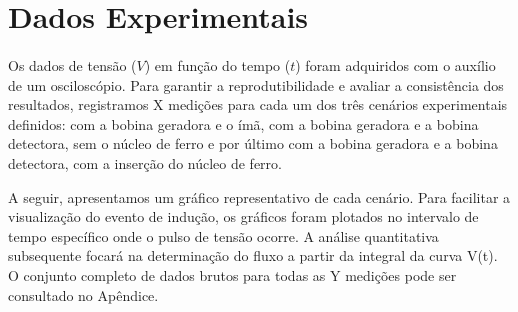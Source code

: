 \documentclass[column,brazilian,12pt,a4paper,final]{article}
\begin{document}
\section{Dados Experimentais}
\paragraph{}
Os dados de tensão ($V$) em função do tempo ($t$) foram adquiridos com o auxílio de um osciloscópio. Para garantir a reprodutibilidade e avaliar a consistência dos resultados, registramos X medições para cada um dos três cenários experimentais definidos: com a bobina geradora e o ímã, com a bobina geradora e a bobina detectora, sem o núcleo de ferro e por último com a bobina geradora e a bobina detectora, com a inserção do núcleo de ferro.

A seguir, apresentamos um gráfico representativo de cada cenário. Para facilitar a visualização do evento de indução, os gráficos foram plotados no intervalo de tempo específico onde o pulso de tensão ocorre. A análise quantitativa subsequente focará na determinação do fluxo a partir da integral da curva V(t). O conjunto completo de dados brutos para todas as Y medições pode ser consultado no Apêndice.
\end{document}
